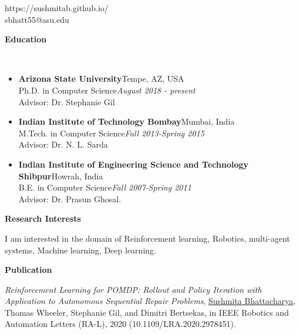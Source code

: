 \documentclass[a4paper,11pt]{article}
\newcommand{\lsep}{-0.5cm}
\newcommand{\resheading}[1]{{\small \colorbox{mygrey}{\begin{minipage}{0.975\textwidth}{\textbf{#1 \vphantom{p\^{E}}}}\end{minipage}}}}
\begin{document}
\hfill https://sushmitab.github.io/\\
\hfill sbhatt55@asu.edu\\
\setlength{\tabcolsep}{5pt}

\vspace{10pt}

\resheading{\textbf{\large Education} }\\[\lsep]
\begin{description}
\item 
\begin{itemize}
	
\item \textbf{Arizona State University}\hfill Tempe, AZ, USA\\
	Ph.D. in Computer Science\hfill \textit{August 2018 - present}\\
	Advisor: Dr. Stephanie Gil
\end{itemize}
\item
\begin{itemize}
\item \textbf{Indian Institute of Technology Bombay}\hfill Mumbai, India\\
	M.Tech. in Computer Science\hfill \textit{Fall 2013-Spring 2015}\\
	Advisor: Dr. N. L. Sarda
\end{itemize}
\item
\begin{itemize}
\item \textbf{Indian Institute of Engineering Science and Technology Shibpur}\hfill Howrah, India\\
	B.E. in Computer Science\hfill \textit{Fall 2007-Spring 2011}\\
	Advisor: Dr. Prasun Ghosal.
\end{itemize}
\end{description}

\resheading{\textbf{\large Research Interests}}
\begin{description}
	\item \hspace{0.75 cm} I am interested in the domain of Reinforcement learning, Robotics, multi-agent systems, Machine learning, Deep learning.
\end{description}


\resheading{\textbf{\large Publication}}
\begin{description}
	\item \hspace{0.65 cm} \textit{Reinforcement Learning for POMDP: Rollout and Policy Iteration with Application to Autonomous Sequential Repair Problems}, \underline{Sushmita Bhattacharya}, Thomas Wheeler, Stephanie Gil, and Dimitri Bertsekas, in IEEE Robotics and Automation Letters (RA-L), 2020 (10.1109/LRA.2020.2978451).
\end{description}
\end{document}

